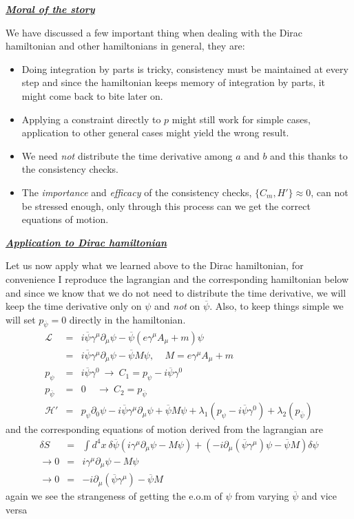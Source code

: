 \documentclass[aps,preprint,preprintnumbers,nofootinbib,showpacs,prd]{revtex4-1}
\newcommand{\bit}{\begin{itemize}}
\newcommand{\eit}{\end{itemize}}
\newcommand{\nbea}{\begin{eqnarray*}}
\newcommand{\neea}{\end{eqnarray*}}
\begin{document}
\bigskip
\underline{\textbf{\textit{Moral of the story}}}

We have discussed a few important thing when dealing with the Dirac hamiltonian and other hamiltonians in general, they are:
\bit
\item Doing integration by parts is tricky, consistency must be maintained at every step and since the hamiltonian keeps memory of integration by parts, it might come back to bite later on.
\item Applying a constraint directly to $p$ might still work for simple cases, application to other general cases might yield the wrong result.
\item We need {\it not} distribute the time derivative among $a$ and $b$ and this thanks to the consistency checks.
\item The {\it importance} and {\it efficacy} of the consistency checks, $\{C_m, H'\} \approx 0$, can not be stressed enough, only through this process can we get the correct equations of motion.
\eit 

\bigskip
\underline{\textbf{\textit{Application to Dirac hamiltonian}}}

Let us now apply what we learned above to the Dirac hamiltonian, for convenience I reproduce the lagrangian and the corresponding hamiltonian below and since we know that we do not need to distribute the time derivative, we will keep the time derivative only on $\psi$ and {\it not} on $\overline \psi$. Also, to keep things simple we will set $p_{\overline \psi} = 0$ directly in the hamiltonian.
%
\nbea
\mathcal{L} & = & i \overline \psi \gamma^\mu \partial_\mu \psi - \overline \psi \left ( e \gamma^\mu A_\mu + m\right ) \psi \\
 & = & i \overline \psi \gamma^\mu \partial_\mu \psi - \overline \psi M \psi, ~~~~~ M =  e \gamma^\mu A_\mu + m \\
p_\psi & = & i \overline \psi \gamma^0~ \to~ C_1 = p_\psi - i \overline \psi \gamma^0 \\
p_{\overline \psi} & = & 0 ~~~~~\to ~ C_2 = p_{\overline \psi} \\
\mathcal{H}' & = & p_\psi \partial_0\psi - i \overline \psi \gamma^\mu \partial_\mu \psi + \overline \psi M \psi + \lambda_1 (p_\psi - i \overline \psi \gamma^0) + \lambda_2(p_{\overline \psi})
\neea
%
and the corresponding equations of motion derived from the lagrangian are
%
\nbea
\delta S & = & \int d^4x~ \delta \overline \psi (i \gamma^\mu \partial_\mu \psi  - M\psi) + (-i \partial_\mu (\overline \psi \gamma^\mu) \psi  - \overline \psi M) \delta\psi \\
\to 0 & = & i \gamma^\mu \partial_\mu \psi  - M\psi \\
\to 0 & = & -i \partial_\mu (\overline \psi \gamma^\mu) - \overline \psi M
\neea
%
again we see the strangeness of getting the e.o.m of $\psi$ from varying $\overline \psi$ and vice versa
\end{document}
